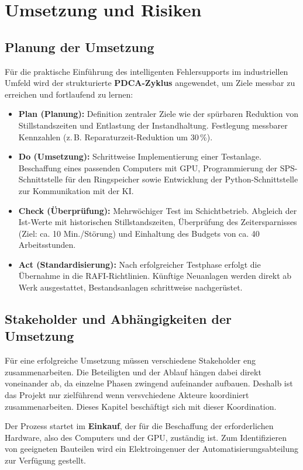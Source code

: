 \section{Umsetzung und Risiken}

\subsection{Planung der Umsetzung}
Für die praktische Einführung des intelligenten Fehlersupports im industriellen Umfeld wird der strukturierte \textbf{PDCA-Zyklus} angewendet, um Ziele messbar zu erreichen und fortlaufend zu lernen:

\begin{itemize}[leftmargin=*, itemsep=2pt, parsep=0pt]
    \item \textbf{Plan (Planung):} Definition zentraler Ziele wie der spürbaren Reduktion von Stillstandszeiten und Entlastung der Instandhaltung. Festlegung messbarer Kennzahlen (z.\,B. Reparaturzeit-Reduktion um 30\,\%).
    \item \textbf{Do (Umsetzung):} Schrittweise Implementierung einer Testanlage. Beschaffung eines passenden Computers mit GPU, Programmierung der SPS-Schnittstelle für den Ringspeicher sowie Entwicklung der Python-Schnittstelle zur Kommunikation mit der KI.
    \item \textbf{Check (Überprüfung):} Mehrwöchiger Test im Schichtbetrieb. Abgleich der Ist-Werte mit historischen Stillstandszeiten, Überprüfung des Zeitersparnisses (Ziel: ca. 10 Min./Störung) und Einhaltung des Budgets von ca. 40 Arbeitsstunden.
    \item \textbf{Act (Standardisierung):} Nach erfolgreicher Testphase erfolgt die Übernahme in die RAFI-Richtlinien. Künftige Neuanlagen werden direkt ab Werk ausgestattet, Bestandsanlagen schrittweise nachgerüstet.
\end{itemize}

\subsection{Stakeholder und Abhängigkeiten der Umsetzung}
Für eine erfolgreiche Umsetzung müssen verschiedene Stakeholder eng zusammenarbeiten. 
Die Beteiligten und der Ablauf hängen dabei direkt voneinander ab, da einzelne Phasen zwingend aufeinander aufbauen.
Deshalb ist das Projekt nur zielführend wenn versvchiedene Akteure koordiniert zusammenarbeiten. 
Dieses Kapitel beschäftigt sich mit dieser Koordination. 

Der Prozess startet im \textbf{Einkauf}, der für die Beschaffung der erforderlichen Hardware, also des Computers und der GPU, zuständig ist. 
Zum Identifizieren von geeigneten Bauteilen wird ein Elektroingenuer der Automatisierungsabteilung zur Verfügung gestellt. 

